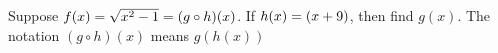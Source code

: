 
%
%
%
%      
% 
% 
%   



\SQUARE{\vbtwo}{\n}
\gcalcexpr[0]\p{-(\vbone - \n)}

\question Suppose $f(x) = \sqrt{x^2 - 1} = (g \circ h)(x)$. If $h(x) = (x + 9)$, 
then find $g(x)$. The notation $(g\circ h)(x)$ means $g(h(x))$

\insertQR[-15pt]{}

\watchout

